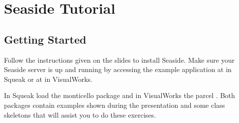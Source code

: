 \ifx\wholebook\relax\else


\fi

\chapter{Seaside Tutorial}





%
%




\section{Getting Started}

Follow the instructions given on the slides to install Seaside. Make sure your Seaside server is up and running by accessing the example application at  in Squeak or at  in VisualWorks.

In Squeak load the monticello package  and in VisualWorks the parcel . Both packages contain examples shown during the presentation and some class skeletons that will assist you to do these exercises.

